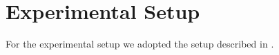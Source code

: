 \chapter{Experimental Setup}

For the experimental setup we adopted the setup described in \cite{Hertlein2017}.

